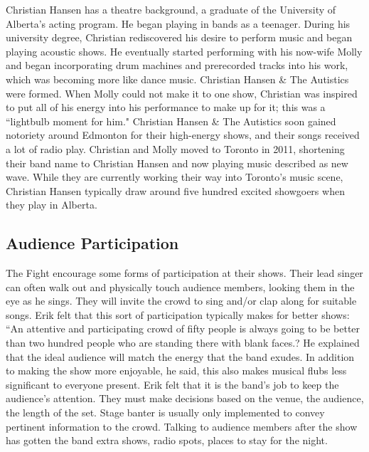 Christian Hansen has a theatre background, a graduate of the University of Alberta's acting program. He began playing in bands as a teenager. During his university degree, Christian rediscovered his desire to perform music and began playing acoustic shows. He eventually started performing with his now-wife Molly and began incorporating drum machines and prerecorded tracks into his work, which was becoming more like dance music. Christian Hansen \& The Autistics were formed. When Molly could not make it to one show, Christian was inspired to put all of his energy into his performance to make up for it; this was a ``lightbulb moment for him." Christian Hansen \& The Autistics soon gained notoriety around Edmonton for their high-energy shows, and their songs received a lot of radio play. Christian and Molly moved to Toronto in 2011, shortening their band name to Christian Hansen and now playing music described as new wave. While they are currently working their way into Toronto's music scene, Christian Hansen typically draw around five hundred excited showgoers when they play in Alberta.

\subsection{Audience Participation}

The Fight encourage some forms of participation at their shows. Their lead singer can often walk out and physically touch audience members, looking them in the eye as he sings. They will invite the crowd to sing and/or clap along for suitable songs. Erik felt that this sort of participation typically makes for better shows: ``An attentive and participating crowd of fifty people is always going to be better than two hundred people who are standing there with blank faces.? He explained that the ideal audience will match the energy that the band exudes. In addition to making the show more enjoyable, he said, this also makes musical flubs less significant to everyone present. Erik felt that it is the band's job to keep the audience's attention. They must make decisions based on the venue, the audience, the length of the set. Stage banter is usually only implemented to convey pertinent information to the crowd. Talking to audience members after the show has gotten the band extra shows, radio spots, places to stay for the night. 

